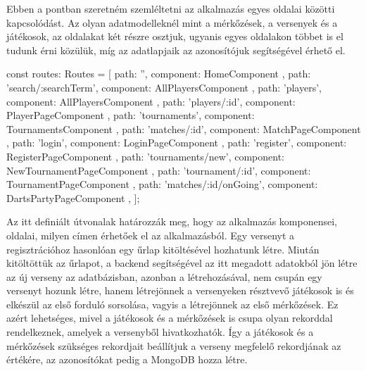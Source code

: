 Ebben a pontban szeretném szemléltetni az alkalmazás egyes oldalai közötti kapcsolódást. Az olyan adatmodelleknél mint a mérkőzések, a versenyek és a játékosok, az oldalakat két részre osztjuk, ugyanis egyes oldalakon többet is el tudunk érni közülük, míg az adatlapjaik az azonosítójuk segítségével érhető el.
\begin{cpp}
const routes: Routes = [
  { path: '', component: HomeComponent },
  { path: 'search/:searchTerm', component: AllPlayersComponent },
  { path: 'players', component: AllPlayersComponent },
  { path: 'players/:id', component: PlayerPageComponent },
  { path: 'tournaments', component: TournamentsComponent },
  { path: 'matches/:id', component: MatchPageComponent },
  { path: 'login', component: LoginPageComponent },
  { path: 'register', component: RegisterPageComponent },
  { path: 'tournaments/new', component: NewTournamentPageComponent },
  { path: 'tournament/:id', component: TournamentPageComponent },
  { path: 'matches/:id/onGoing', component: DartsPartyPageComponent },
];
\end{cpp}
Az itt definiált útvonalak határozzák meg, hogy az alkalmazás komponensei, oldalai, milyen címen érhetőek el az alkalmazásból.
Egy versenyt a regisztrációhoz hasonlóan egy űrlap kitöltésével hozhatunk létre. Miután kitöltöttük az űrlapot, a backend segítségével az itt megadott adatokból jön létre az új verseny az adatbázisban, azonban a létrehozásával, nem csupán egy versenyt hozunk létre, hanem létrejönnek a versenyeken résztvevő játékosok is és elkészül az első forduló sorsolása, vagyis a létrejönnek az első mérkőzések. Ez azért lehetséges, mivel a játékosok és a mérkőzések is csupa olyan rekorddal rendelkeznek, amelyek a versenyből hivatkozhatók. Így a játékosok és a mérkőzések szükséges rekordjait beállítjuk a verseny megfelelő rekordjának az értékére, az azonosítókat pedig a MongoDB hozza létre.


